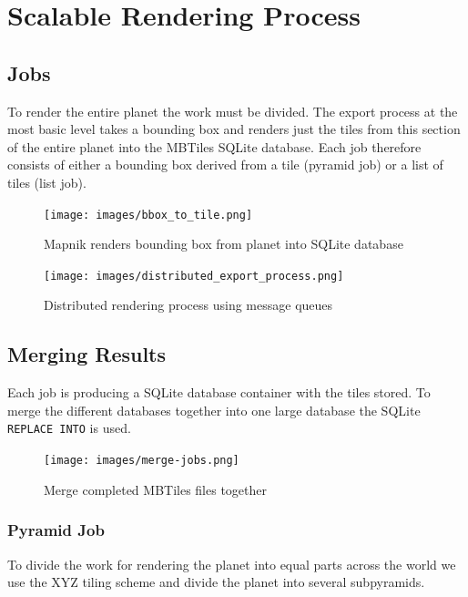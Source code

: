 \chapter{Scalable Rendering Process}

\section{Jobs}

To render the entire planet the work must be divided.
The export process at the most basic level takes a bounding box and renders just
the tiles from this section of the entire planet into the MBTiles SQLite database.
Each job therefore consists of either a bounding box derived from a tile (pyramid job) or a list of tiles (list job).

\begin{figure}[H]
  \centering
  \texttt{[image: images/bbox\_to\_tile.png]}
  \caption{Mapnik renders bounding box from planet into SQLite database}
\end{figure}

\begin{figure}[H]
  \centering
  \texttt{[image: images/distributed\_export\_process.png]}
  \caption{Distributed rendering process using message queues}
\end{figure}

\section{Merging Results}

Each job is producing a SQLite database container with the tiles stored.
To merge the different databases together into one large database the SQLite \texttt{REPLACE INTO} is used.

\begin{figure}[H]
  \centering
  \texttt{[image: images/merge-jobs.png]}
  \caption{Merge completed MBTiles files together}
\end{figure}


\subsection{Pyramid Job}

To divide the work for rendering the planet into equal parts across the world we use the XYZ tiling scheme and divide the planet into several subpyramids.


